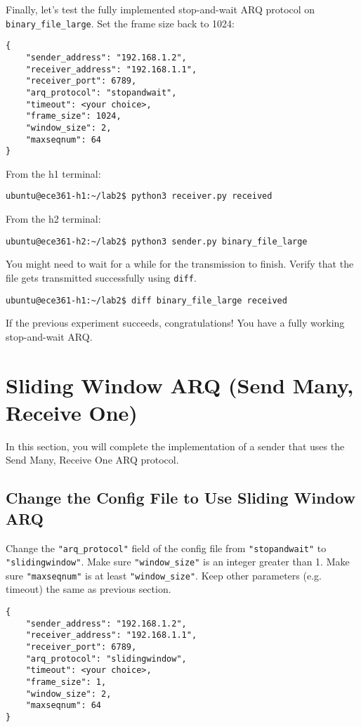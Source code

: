 \documentclass[11pt]{article}
\begin{document}
Finally, let's test the fully implemented stop-and-wait ARQ protocol on \texttt{binary\_file\_large}. Set the frame size back to 1024:

\begin{lstlisting}[style=ece361-shell-base, caption={Configuration For Large File}]
{
    "sender_address": "192.168.1.2",
    "receiver_address": "192.168.1.1",
    "receiver_port": 6789,
    "arq_protocol": "stopandwait",
    "timeout": <your choice>,
    "frame_size": 1024,
    "window_size": 2,
    "maxseqnum": 64
}
\end{lstlisting}
From the h1 terminal:
\begin{lstlisting}[style=ece361-shell-base]
ubuntu@ece361-h1:~/lab2$ python3 receiver.py received
\end{lstlisting}
From the h2 terminal:
\begin{lstlisting}[style=ece361-shell-base]
ubuntu@ece361-h2:~/lab2$ python3 sender.py binary_file_large
\end{lstlisting}

\noindent You might need to wait for a while for the transmission to finish. Verify that the file gets transmitted successfully using \texttt{diff}.
\begin{lstlisting}[style=ece361-shell-base]
ubuntu@ece361-h1:~/lab2$ diff binary_file_large received
\end{lstlisting}

\noindent If the previous experiment succeeds, congratulations! You have a fully working stop-and-wait ARQ.

\section{Sliding Window ARQ (Send Many, Receive One)}
In this section, you will complete the implementation of a sender that uses the Send Many, Receive One ARQ protocol.

\subsection{Change the Config File to Use Sliding Window ARQ}
Change the \texttt{"arq\_protocol"} field of the config file from \texttt{"stopandwait"} to \texttt{"slidingwindow"}.
Make sure \texttt{"window\_size"} is an integer greater than 1.
Make sure \texttt{"maxseqnum"} is at least \texttt{"window\_size"}.
Keep other parameters (e.g. timeout) the same as previous section.

\begin{lstlisting}[style=ece361-shell-base, caption={Sliding Window Configuration}]
{
    "sender_address": "192.168.1.2",
    "receiver_address": "192.168.1.1",
    "receiver_port": 6789,
    "arq_protocol": "slidingwindow",
    "timeout": <your choice>,
    "frame_size": 1,
    "window_size": 2,
    "maxseqnum": 64
}
\end{lstlisting}
\end{document}
